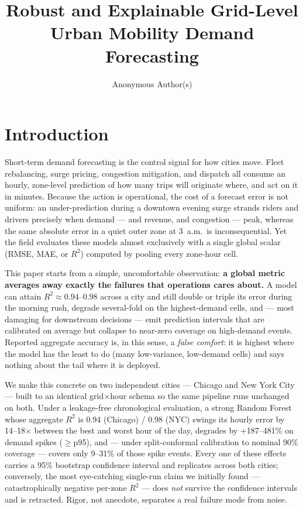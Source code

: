 \documentclass[sigconf, review, nonacm]{acmart}
\title{Robust and Explainable Grid-Level Urban Mobility Demand Forecasting}
\author{Anonymous Author(s)}
\affiliation{%
  \institution{Affiliation}
  \city{City}
  \country{Country}}
\begin{document}
\maketitle

\section{Introduction}
Short-term demand forecasting is the control signal for how cities move. Fleet rebalancing, surge
pricing, congestion mitigation, and dispatch all consume an hourly, zone-level prediction of how many
trips will originate where, and act on it in minutes. Because the action is operational, the cost of a
forecast error is not uniform: an under-prediction during a downtown evening surge strands riders and
drivers precisely when demand --- and revenue, and congestion --- peak, whereas the same absolute error
in a quiet outer zone at 3~a.m.\ is inconsequential. Yet the field evaluates these models almost
exclusively with a single global scalar (RMSE, MAE, or $R^2$) computed by pooling every zone-hour cell.

This paper starts from a simple, uncomfortable observation: \textbf{a global metric averages away
exactly the failures that operations cares about.} A model can attain $R^2{\approx}0.94$--$0.98$ across
a city and still double or triple its error during the morning rush, degrade several-fold on the
highest-demand cells, and --- most damaging for downstream decisions --- emit prediction intervals that
are calibrated on average but collapse to near-zero coverage on high-demand events. Reported aggregate
accuracy is, in this sense, a \emph{false comfort}: it is highest where the model has the least to do
(many low-variance, low-demand cells) and says nothing about the tail where it is deployed.

We make this concrete on two independent cities --- Chicago and New York City --- built to an identical
grid$\times$hour schema so the same pipeline runs unchanged on both. Under a leakage-free chronological
evaluation, a strong Random Forest whose aggregate $R^2$ is 0.94 (Chicago) / 0.98 (NYC) swings its
hourly error by 14--18$\times$ between the best and worst hour of the day, degrades by $+$187--481\% on
demand spikes ($\geq$p95), and --- under split-conformal calibration to nominal 90\% coverage --- covers
only 9--31\% of those spike events. Every one of these effects carries a 95\% bootstrap confidence
interval and replicates across both cities; conversely, the most eye-catching single-run claim we
initially found --- catastrophically negative per-zone $R^2$ --- does \emph{not} survive the confidence
intervals and is retracted. Rigor, not anecdote, separates a real failure mode from noise.
\end{document}
